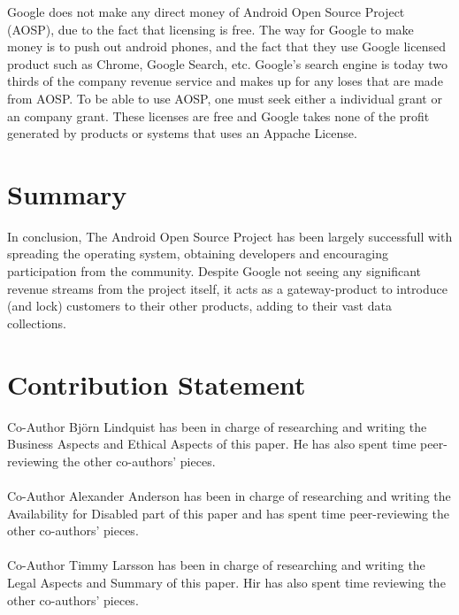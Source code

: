 \documentclass[conference]{IEEEtran}
\begin{document}
Google does not make any direct money of Android Open Source Project (AOSP), due to the fact that licensing is free.\cite{Money} The way for Google to make money is to push out android phones, and the fact that they use Google licensed product such as Chrome, Google Search, etc. Google's search engine is today two thirds of the company revenue service and makes up for any loses that are made from AOSP. To be able to use AOSP, one must seek either a individual grant or an company grant. \cite{android-licenses} These licenses are free and Google takes none of the profit generated by products or systems that uses an Appache License.

\section{Summary}

{In conclusion, The Android Open Source Project has been largely successfull with spreading the operating system, obtaining developers and encouraging participation from the community. Despite Google not seeing any significant revenue streams from the project itself, it acts as a gateway-product to introduce (and lock) customers to their other products, adding to their vast data collections.}


\section{Contribution Statement}

{Co-Author Björn Lindquist has been in charge of researching and writing the Business Aspects and Ethical Aspects of this paper. He has also spent time peer-reviewing the other co-authors' pieces.}
\\
\\
{Co-Author Alexander Anderson has been in charge of researching and writing the Availability for Disabled part of this paper and has spent time peer-reviewing the other co-authors' pieces.}
\\
\\
{Co-Author Timmy Larsson has been in charge of researching and writing the Legal Aspects and Summary of this paper. Hir has also spent time reviewing the other co-authors' pieces.}
\end{document}
